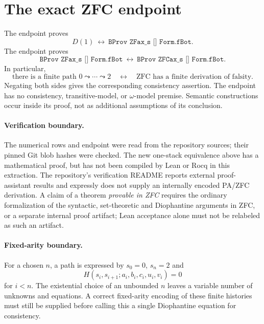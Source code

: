 \documentclass[11pt]{article}
\begin{document}
\section{The exact ZFC endpoint}

The endpoint  proves
\[
 D(1)\ \longleftrightarrow\ \texttt{BProv ZFax\_s [] Form.fBot}.
\]
The endpoint  proves
\[
 \texttt{BProv ZFax\_s [] Form.fBot}\ \longleftrightarrow\
 \texttt{BProv ZFCax\_s [] Form.fBot}.
\]
In particular,
\[
 \text{there is a finite path }0\leadsto\cdots\leadsto2
 \quad\longleftrightarrow\quad
 \text{ZFC has a finite derivation of falsity}.
\]
Negating both sides gives the corresponding consistency assertion.
The endpoint has no consistency, transitive-model, or \(\omega\)-model
premise. Semantic constructions occur inside its proof, not as additional
assumptions of its conclusion.

\paragraph{Verification boundary.}
The numerical rows and endpoint were read from the repository sources;
their pinned Git blob hashes were checked. The new one-stack equivalence
above has a mathematical proof, but has not been compiled by Lean or Rocq
in this extraction. The repository's verification README reports external
proof-assistant results and expressly does not supply an internally encoded
PA/ZFC derivation. A claim of a theorem \emph{provable in ZFC} requires the
ordinary formalization of the syntactic, set-theoretic and Diophantine
arguments in ZFC, or a separate internal proof artifact; Lean acceptance
alone must not be relabeled as such an artifact.

\paragraph{Fixed-arity boundary.}
For a chosen \(n\), a path is expressed by \(s_0=0\), \(s_n=2\) and
\[H(s_i,s_{i+1};a_i,b_i,c_i,u_i,v_i)=0\] for \(i<n\).
The existential choice of an unbounded \(n\) leaves a variable number of
unknowns and equations. A correct fixed-arity encoding of these finite
histories must still be supplied before calling this a single Diophantine
equation for consistency.
\end{document}
